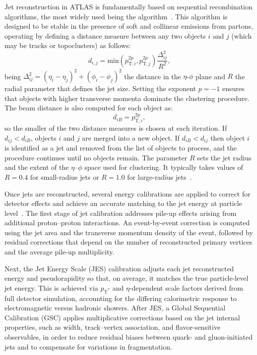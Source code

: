 Jet reconstruction in ATLAS is fundamentally based on sequential recombination algorithms, the most widely used being the \antikt algorithm~\cite{Cacciari_2008}. This algorithm is designed to be stable in the presence of soft and collinear emissions from partons, operating by defining a distance measure between any two objects $i$ and $j$ (which may be tracks or topoclusters) as follows:
\begin{equation}
  d_{i,j} = \text{min}(p^{2p}_{\text{T},i},p^{2p}_{\text{T},j})\frac{\Delta^{2}_{ij}}{R^{2}},
\end{equation}
being $\Delta^{2}_{ij} = (\eta_{i} - \eta_{j})^2 + (\phi_{i} - \phi_{j})^2$ the distance in the $\eta$-$\phi$ plane and $R$ the radial parameter that defines the jet size. Setting the exponent $p=-1$ ensures that objects with higher transverse momenta dominate the clustering procedure. The beam distance is also computed for each object as:
\begin{equation}
  d_{iB} = p^{2p}_{\text{T},i},
\end{equation}
so the smaller of the two distance measures is chosen at each iteration. If $d_{ij}<d_{iB}$, objects \(i\) and \(j\) are merged into a new object. If $d_{iB}<d_{ij}$ then object \(i\) is identified as a jet and removed from the list of objects to process, and the procedure continues until no objects remain. The parameter \(R\) sets the jet radius and the extent of the \(\eta\)–\(\phi\) space used for clustering. It typically takes values of \(R = 0.4\) for small-radius jets or \(R = 1.0\) for large-radius jets~\cite{jets_cluster}.

Once jets are reconstructed, several energy calibrations are applied to correct for detector effects and achieve an accurate matching to the jet energy at particle level~\cite{jets_calib}. The first stage of jet calibration addresses pile-up effects arising from additional proton–proton interactions. An event-by-event correction is computed using the jet area and the transverse momentum density of the event, followed by residual corrections that depend on the number of reconstructed primary vertices and the average pile-up multiplicity. 

Next, the Jet Energy Scale (JES) calibration adjusts each jet reconstructed energy and pseudorapidity so that, on average, it matches the true particle-level jet energy. This is achieved via $p_{\text{T}}$- and $\eta$-dependent scale factors derived from full detector simulation, accounting for the differing calorimetric response to electromagnetic versus hadronic showers. After JES, a Global Sequential Calibration (GSC) applies multiplicative corrections based on the jet internal properties, such as width, track–vertex association, and flavor-sensitive observables, in order to reduce residual biases between quark- and gluon-initiated jets and to compensate for variations in fragmentation.

